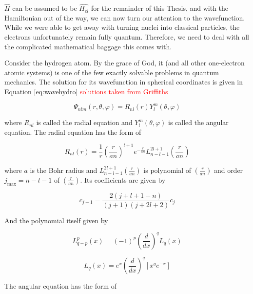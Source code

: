\documentclass[12pt]{report}
\newcommand{\notetodylan}[1]{\textcolor{red}{#1}} %
\begin{document}
$\hat{H}$ can be assumed to be $\hat{H_{el}}$ for the remainder of this Thesis, and with the Hamiltonian out of the way, we can now turn our attention to the wavefunction. While we were able to get away with turning nuclei into classical particles, the electrons unfortunately remain fully quantum. Therefore, we need to deal with all the complicated mathematical baggage this comes with.

Consider the hydrogen atom. By the grace of God, it (and all other one-electron atomic systems) is one of the few exactly solvable problems in quantum mechanics. The solution for its wavefunction in spherical coordinates is given in Equation \ref{eq:wavehydro} \notetodylan{solutions taken from Griffiths}

\begin{equation}
\label{eq:wavehydro}
\Psi_{nlm}(r, \theta, \varphi) = R_{nl}(r)Y^{m}_{l}(\theta,\varphi)
\end{equation} 

where $R_{nl}$ is called the radial equation and $Y^{m}_{l}(\theta,\varphi)$ is called the angular equation. The radial equation has the form of

\begin{equation}
\label{eq:wavehydro_R}
R_{nl}(r) = \frac{1}{r}\left(\frac{r}{an}\right)^{l+1}e^{-\frac{r}{an}}L^{2l+1}_{n-l-1}\left(\frac{r}{an}\right)
\end{equation} 

where $a$ is the Bohr radius and $L^{2l+1}_{n-l-1}\left(\frac{r}{an}\right)$ is polynomial of $\left(\frac{r}{an}\right)$ and order $j_{\text{max}}=n-l-1$ of $\left(\frac{r}{an}\right)$. Its coefficients are given by

\begin{equation}
\label{eq:wavehydro_R_coef}
c_{j+1} = \frac{2(j+l+1-n)}{(j+1)(j+2l+2)}c_{j}
\end{equation} 

And the polynomial itself given by

\begin{equation}
\label{eq:wavehydro_L1}
L^{p}_{q-p}(x) = (-1)^{p}\left(\frac{d}{dx}\right)^{q}L_{q}(x)
\end{equation}

\begin{equation}
\label{eq:wavehydro_L2}
L_{q}(x) = e^{x}\left(\frac{d}{dx}\right)^{q}\left[x^{q}e^{-x}\right]
\end{equation}

The angular equation has the form of 
\end{document}
